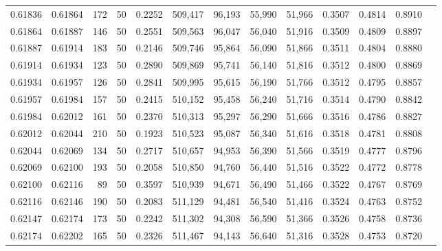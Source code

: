 \begin{tabular}{rrrrrrrrrrrrr}
0.61836 & 0.61864 &   172 &  50 &                                     0.2252 & 509,417 &  96,193 &  55,990 &  51,966 & 0.3507 & 0.4814 & 0.8910 \\
0.61864 & 0.61887 &   146 &  50 &                                     0.2551 & 509,563 &  96,047 &  56,040 &  51,916 & 0.3509 & 0.4809 & 0.8897 \\
0.61887 & 0.61914 &   183 &  50 &                                     0.2146 & 509,746 &  95,864 &  56,090 &  51,866 & 0.3511 & 0.4804 & 0.8880 \\
0.61914 & 0.61934 &   123 &  50 &                                     0.2890 & 509,869 &  95,741 &  56,140 &  51,816 & 0.3512 & 0.4800 & 0.8869 \\
0.61934 & 0.61957 &   126 &  50 &                                     0.2841 & 509,995 &  95,615 &  56,190 &  51,766 & 0.3512 & 0.4795 & 0.8857 \\
0.61957 & 0.61984 &   157 &  50 &                                     0.2415 & 510,152 &  95,458 &  56,240 &  51,716 & 0.3514 & 0.4790 & 0.8842 \\
0.61984 & 0.62012 &   161 &  50 &                                     0.2370 & 510,313 &  95,297 &  56,290 &  51,666 & 0.3516 & 0.4786 & 0.8827 \\
0.62012 & 0.62044 &   210 &  50 &                                     0.1923 & 510,523 &  95,087 &  56,340 &  51,616 & 0.3518 & 0.4781 & 0.8808 \\
0.62044 & 0.62069 &   134 &  50 &                                     0.2717 & 510,657 &  94,953 &  56,390 &  51,566 & 0.3519 & 0.4777 & 0.8796 \\
0.62069 & 0.62100 &   193 &  50 &                                     0.2058 & 510,850 &  94,760 &  56,440 &  51,516 & 0.3522 & 0.4772 & 0.8778 \\
0.62100 & 0.62116 &    89 &  50 &                                     0.3597 & 510,939 &  94,671 &  56,490 &  51,466 & 0.3522 & 0.4767 & 0.8769 \\
0.62116 & 0.62146 &   190 &  50 &                                     0.2083 & 511,129 &  94,481 &  56,540 &  51,416 & 0.3524 & 0.4763 & 0.8752 \\
0.62147 & 0.62174 &   173 &  50 &                                     0.2242 & 511,302 &  94,308 &  56,590 &  51,366 & 0.3526 & 0.4758 & 0.8736 \\
0.62174 & 0.62202 &   165 &  50 &                                     0.2326 & 511,467 &  94,143 &  56,640 &  51,316 & 0.3528 & 0.4753 & 0.8720 \\

\end{tabular}
